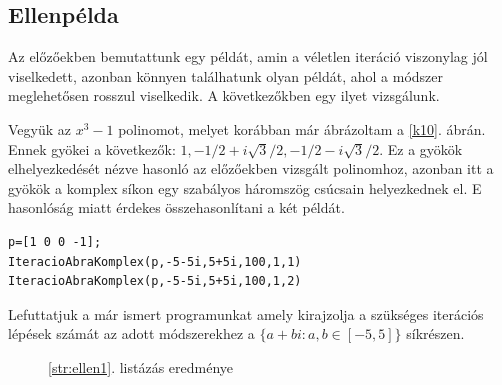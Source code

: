 \documentclass[a4paper,12pt]{report}
\begin{document}
			\subsection{Ellenpélda}
                Az előzőekben bemutattunk egy példát, amin a véletlen iteráció viszonylag jól viselkedett, azonban könnyen találhatunk olyan példát, ahol a módszer meglehetősen rosszul viselkedik. A következőkben egy ilyet vizsgálunk.
                
                Vegyük az $x^3-1$ polinomot, melyet korábban már ábrázoltam a \ref{k10}. ábrán. Ennek gyökei a következők: $1, -1/2+i\sqrt{3}/2, -1/2-i\sqrt{3}/2$. Ez a gyökök elhelyezkedését nézve hasonló az előzőekben vizsgált polinomhoz, azonban itt a gyökök a komplex síkon egy szabályos háromszög csúcsain helyezkednek el. E hasonlóság miatt érdekes összehasonlítani a két példát.
                \begin{singlespace}
                \begin{lstlisting}[caption=Bemenet,label=str:ellen1]
p=[1 0 0 -1];
IteracioAbraKomplex(p,-5-5i,5+5i,100,1,1)
IteracioAbraKomplex(p,-5-5i,5+5i,100,1,2)
                \end{lstlisting}
                \end{singlespace}
                Lefuttatjuk a már ismert programunkat amely kirajzolja a szükséges iterációs lépések számát az adott módszerekhez a $\{a+bi:a,b\in[-5,5]\}$ síkrészen.
                           \begin{figure}[hp]
					\centering
			        \caption{\ref{str:ellen1}. listázás eredménye}
				\end{figure}       
\end{document}
